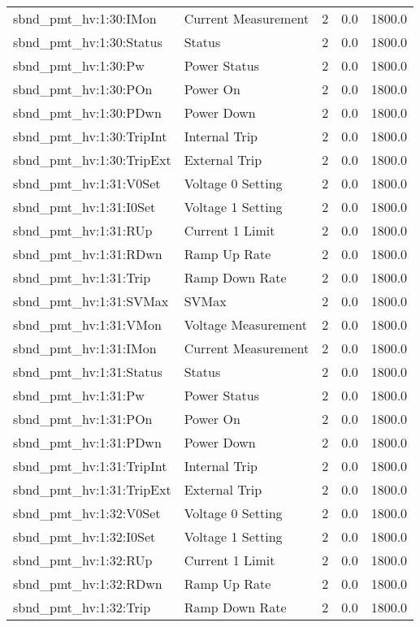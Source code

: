 \begin{center}
\begin{longtable}{l | l l l l }
sbnd\_pmt\_hv:1:30:IMon & Current Measurement & 2 & 0.0 & 1800.0\\ 
sbnd\_pmt\_hv:1:30:Status & Status & 2 & 0.0 & 1800.0\\ 
sbnd\_pmt\_hv:1:30:Pw & Power Status & 2 & 0.0 & 1800.0\\ 
sbnd\_pmt\_hv:1:30:POn & Power On & 2 & 0.0 & 1800.0\\ 
sbnd\_pmt\_hv:1:30:PDwn & Power Down & 2 & 0.0 & 1800.0\\ 
sbnd\_pmt\_hv:1:30:TripInt & Internal Trip & 2 & 0.0 & 1800.0\\ 
sbnd\_pmt\_hv:1:30:TripExt & External Trip & 2 & 0.0 & 1800.0\\ 
sbnd\_pmt\_hv:1:31:V0Set & Voltage 0 Setting & 2 & 0.0 & 1800.0\\ 
sbnd\_pmt\_hv:1:31:I0Set & Voltage 1 Setting & 2 & 0.0 & 1800.0\\ 
sbnd\_pmt\_hv:1:31:RUp & Current 1 Limit & 2 & 0.0 & 1800.0\\ 
sbnd\_pmt\_hv:1:31:RDwn & Ramp Up Rate & 2 & 0.0 & 1800.0\\ 
sbnd\_pmt\_hv:1:31:Trip & Ramp Down Rate & 2 & 0.0 & 1800.0\\ 
sbnd\_pmt\_hv:1:31:SVMax & SVMax & 2 & 0.0 & 1800.0\\ 
sbnd\_pmt\_hv:1:31:VMon & Voltage Measurement & 2 & 0.0 & 1800.0\\ 
sbnd\_pmt\_hv:1:31:IMon & Current Measurement & 2 & 0.0 & 1800.0\\ 
sbnd\_pmt\_hv:1:31:Status & Status & 2 & 0.0 & 1800.0\\ 
sbnd\_pmt\_hv:1:31:Pw & Power Status & 2 & 0.0 & 1800.0\\ 
sbnd\_pmt\_hv:1:31:POn & Power On & 2 & 0.0 & 1800.0\\ 
sbnd\_pmt\_hv:1:31:PDwn & Power Down & 2 & 0.0 & 1800.0\\ 
sbnd\_pmt\_hv:1:31:TripInt & Internal Trip & 2 & 0.0 & 1800.0\\ 
sbnd\_pmt\_hv:1:31:TripExt & External Trip & 2 & 0.0 & 1800.0\\ 
sbnd\_pmt\_hv:1:32:V0Set & Voltage 0 Setting & 2 & 0.0 & 1800.0\\ 
sbnd\_pmt\_hv:1:32:I0Set & Voltage 1 Setting & 2 & 0.0 & 1800.0\\ 
sbnd\_pmt\_hv:1:32:RUp & Current 1 Limit & 2 & 0.0 & 1800.0\\ 
sbnd\_pmt\_hv:1:32:RDwn & Ramp Up Rate & 2 & 0.0 & 1800.0\\ 
sbnd\_pmt\_hv:1:32:Trip & Ramp Down Rate & 2 & 0.0 & 1800.0\\ 

\end{longtable}
\end{center}
